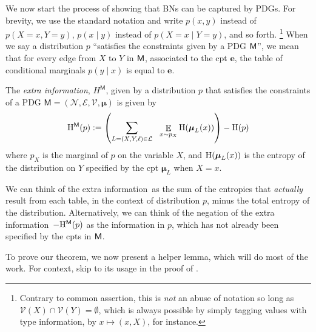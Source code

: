 \documentclass{article}
\newcommand{\bmu}{\boldsymbol{\mu}}
\newcommand{\V}{\mathcal V}
\newcommand{\N}{\mathcal N}
\newcommand{\Ed}{\mathcal E}
\newcommand{\sfM}{\mathsf M}
\def\mnvars[#1]{(\N#1, \Ed#1, \V#1, \bmu#1)}
\def\extrainfo{extra information}
\begin{document}
We now start the process of showing that BNs can be captured by PDGs. 
For brevity, we use the standard notation and write $p(x, y)$ instead of $p(X \!=\! x, Y \!=\! y)$, $p(x \mid y)$ instead of $p(X \!=\! x\mid Y \!=\! y)$, and so forth.%
	\footnote{Contrary to common assertion, this is \emph{not} an abuse of notation so long as $\mathcal V(X) \cap \mathcal V(Y) = \emptyset$, which is always possible by simply tagging values with type information, by $x \mapsto (x, X)$, for instance.}   
When we say a distribution $p$ ``satisfies the constraints given by a PDG $\sf M$'', we mean that for every edge from $X$ to $Y$ in $\sf M$, associated to the cpt $\mathbf e$, the table of conditional marginals $p(y \mid x)$ is equal to $\mathbf e$.
	
\begin{defn}
	The \emph{\extrainfo}, $H^{\sfM}$, given by a distribution $p$ that satisfies the constraints of a PDG $\sfM = \mnvars[]$ is given by
	\[ \H^{\sfM}(p) := \left(\sum_{L = (X,Y, \ell)\in \cal L} ~~\E_{x \sim p_X}  \H (\bmu_L (x)) \right) - \H(p) \] 
	where $p_X$ is the marginal of $p$ on the variable $X$, and $\H(\bmu_L(x))$ is the entropy of the distribution on $Y$ specified by the cpt $\bmu_L$ when $X = x$. 
\end{defn}
We can think of the \extrainfo\ as the sum of the entropies that \emph{actually} result from each table, in the context of distribution $p$, minus the total entropy of the distribution.
Alternatively, we can think of the negation of the \extrainfo\, $-\H^\sfM(p)$ as the information in $p$, which has not already been specified by the cpts in $\sf M$.

To prove our theorem, we now present a helper lemma, which will do most of the work. For context, skip to its usage in the proof of .
\end{document}
